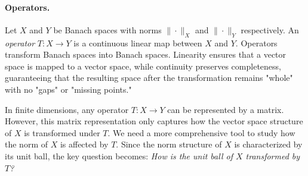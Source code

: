 

\paragraph*{Operators.} Let $X$ and $Y$ be Banach spaces with norms $\|\cdot\|_X$ and $\|\cdot\|_Y$ respectively. An \emph{operator} $T: X \rightarrow Y$ is a continuous linear map between $X$ and $Y$. Operators transform Banach spaces into Banach spaces. Linearity ensures that a vector space is mapped to a vector space, while continuity preserves completeness, guaranteeing that the resulting space after the transformation remains "whole" with no "gaps" or "missing points."

In finite dimensions, any operator $T: X \rightarrow Y$ can be represented by a matrix. However, this matrix representation only captures how the vector space structure of $X$ is transformed under $T$. We need a more comprehensive tool to study how the norm of $X$ is affected by $T$. Since the norm structure of $X$ is characterized by its unit ball, the key question becomes: \emph{How is the unit ball of $X$ transformed by $T$?}

